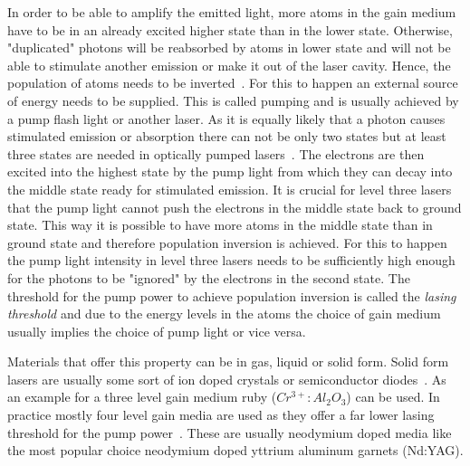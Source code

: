 \documentclass[a4paper,10pt]{article}
\begin{document}
    In order to be able to amplify the emitted light, more atoms in the
    gain medium have to be in an already excited higher state than
    in the lower state.
    Otherwise, "duplicated" photons will be reabsorbed by atoms in lower
    state and will not be able to stimulate another emission or make
    it out of the laser cavity.
    Hence, the population of atoms needs to be inverted~\cite{lasers_liverpool}.
    For this to happen an external source of energy needs to be supplied.
    This is called pumping and is usually achieved by a pump flash light
    or another laser.
    As it is equally likely that a photon causes stimulated emission or
    absorption there can not be only two states but at least three
    states are needed in optically pumped lasers~\cite{lasers_rpphotonics}.
    The electrons are then excited into the highest state by the pump
    light from which they can decay into the middle state ready for
    stimulated emission.
    It is crucial for level three lasers that the pump light cannot
    push the electrons in the middle state back to ground state.
    This way it is possible to have more atoms in the middle state than
    in ground state and therefore population inversion is achieved.
    For this to happen the pump light intensity in level three lasers
    needs to be sufficiently high enough for the photons to be "ignored"
    by the electrons in the second state.
    The threshold for the pump power to achieve population inversion
    is called the \emph{lasing threshold} and due to the
    energy levels in the atoms the choice of gain medium usually
    implies the choice of pump light or vice versa.  

    Materials that offer this property can be in gas, liquid or solid form.
    Solid form lasers are usually some sort of ion doped crystals or
    semiconductor diodes~\cite{lasers_liverpool}.
    As an example for a three level gain medium ruby ($Cr^{3+}:Al_2O_3$)
    can be used.
    In practice mostly four level gain media are used as they offer a 
    far lower lasing threshold for the pump power~\cite{lasers_rpphotonics}.
    These are usually neodymium doped media like the most popular choice
    neodymium doped yttrium aluminum garnets (Nd:YAG).

    \newpage
\end{document}

